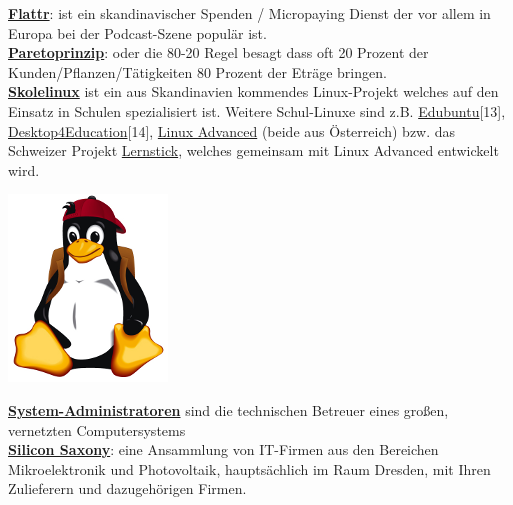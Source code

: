 \href{http://flattr.com}{\textbf{Flattr}}: ist ein skandinavischer Spenden / Micropaying Dienst der vor allem in Europa bei der Podcast-Szene populär ist. \\

\href{http://de.wikipedia.org/wiki/Paretoprinzip}{\textbf{Paretoprinzip}}: oder die 80-20 Regel besagt dass oft 20 Prozent der Kunden/Pflanzen/Tätigkeiten 80 Prozent der Eträge bringen. \\

\href{http://www.skolelinux.org/}{\textbf{Skolelinux}} ist ein aus Skandinavien kommendes Linux-Projekt welches auf den Einsatz in Schulen spezialisiert ist. Weitere Schul-Linuxe sind z.B. \href{http://www.edubuntu.org/}{Edubuntu}[13], \href{http://d4e.at/}{Desktop4Education}[14], \href{http://www.linuxadvanced.at/}{Linux Advanced} (beide aus Österreich) bzw. das Schweizer Projekt \href{http://www.imedias.ch/lernstick}{Lernstick}, welches gemeinsam mit Linux Advanced entwickelt wird. 

\begin{center}
\includegraphics[width=0.5\linewidth]{chemnitz_skole_tux_small.png}
\end{center}

\href{http://de.wikipedia.org/wiki/Systemadministrator}{\textbf{System-Administratoren}} sind die technischen Betreuer eines großen, vernetzten Computersystems\\

\href{http://de.wikipedia.org/wiki/Silicon_Saxony}{\textbf{Silicon Saxony}}: eine Ansammlung von IT-Firmen aus den Bereichen Mikroelektronik und Photovoltaik, hauptsächlich im Raum Dresden, mit Ihren Zulieferern und dazugehörigen Firmen.
